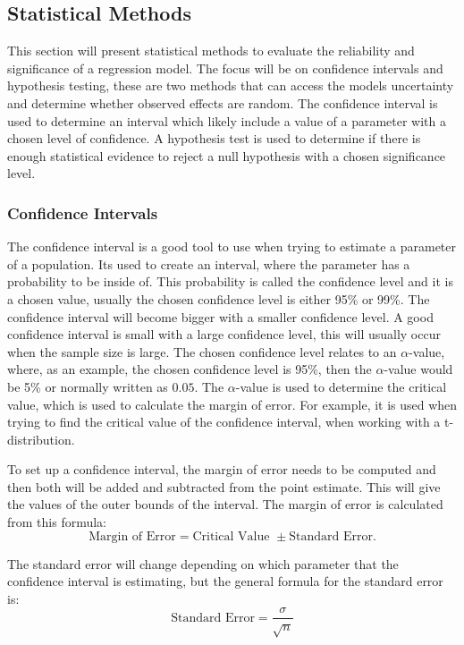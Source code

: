 \subsection{Statistical Methods}
This section will present statistical methods to evaluate the reliability and significance of a regression model. The focus will be on confidence intervals and hypothesis testing, these are two methods that can access the models uncertainty and determine whether observed effects are random. The confidence interval is used to determine an interval which likely include a value of a parameter with a chosen level of confidence. A hypothesis test is used to determine if there is enough statistical evidence to reject a null hypothesis with a chosen significance level.

\subsubsection{Confidence Intervals}
The confidence interval is a good tool to use when trying to estimate a parameter of a population. Its used to create an interval, where the parameter has a probability to be inside of. This probability is called the confidence level and it is a chosen value, usually the chosen confidence level is either 95\% or 99\%. The confidence interval will become bigger with a smaller confidence level. A good confidence interval is small with a large confidence level, this will usually occur when the sample size is large. The chosen confidence level relates to an $\alpha$-value, where, as an example, the chosen confidence level is 95\%, then the $\alpha$-value would be 5\% or normally written as $0.05$. The $\alpha$-value is used to determine the critical value, which is used to calculate the margin of error. For example, it is used when trying to find the critical value of the confidence interval, when working with a t-distribution.
\newline

\noindent To set up a confidence interval, the margin of error needs to be computed and then both will be added and subtracted from the point estimate. This will give the values of the outer bounds of the interval. The margin of error is calculated from this formula:
\begin{equation}
	\text{Margin of Error} = \text{Critical Value } \pm \text{Standard Error}.
\end{equation}

\noindent The standard error will change depending on which parameter that the confidence interval is estimating, but the general formula for the standard error is:
\begin{equation}
	\text{Standard Error} = \frac{\sigma}{\sqrt{n}}
\end{equation}


